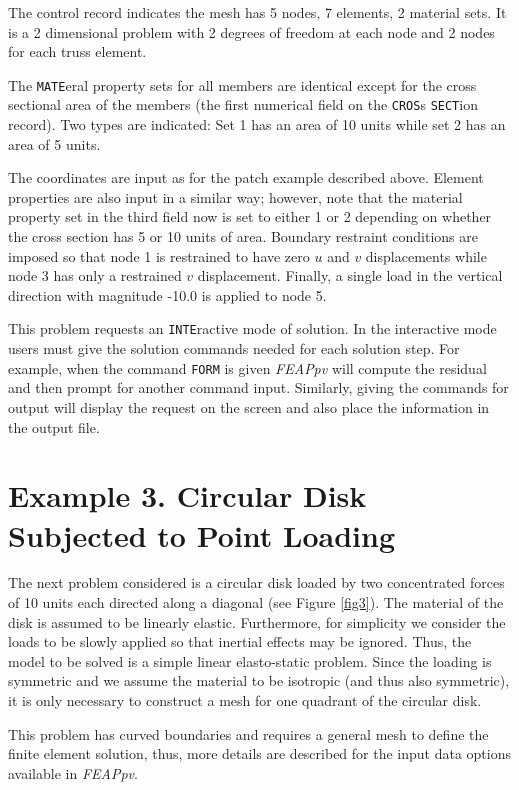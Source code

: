 The control record indicates the mesh has 5 nodes, 7 elements, 2 
material sets. It is a 2 dimensional problem with 2 degrees of freedom at each
node and 2 nodes for each truss element.

The {\tt MATE}eral property sets for all members
are identical except for the cross sectional
area of the members (the first numerical field on the {\tt CROS}s
{\tt SECT}ion record). Two types are indicated: Set 1 has an area of 10 units
while set 2 has an area of 5 units.

The coordinates are input as for the patch example described above.  Element
properties are also input in a similar way; however, note that the material
property set in the third field now is set to either 1 or 2 depending on
whether the cross section has 5 or 10 units of area.
Boundary restraint conditions are imposed so that node 1 is restrained
to have zero $u$ and $v$ displacements while node 3 has only a restrained
$v$ displacement.  Finally, a single load in the vertical direction
with magnitude -10.0 is applied to node 5.

This problem requests an {\tt INTE}ractive mode of solution.  In the interactive
mode users must give the solution commands needed for each solution step.
For example, when the command {\tt FORM} is given {\sl FEAPpv} will compute
the residual and then prompt for another command input.  Similarly, 
giving the commands for output will display the request on the screen and
also place the information in the output file.

\section{Example 3. Circular Disk Subjected to Point Loading}
\label{ex3}

The next problem considered is a circular disk loaded by
two concentrated forces of 10 units each
directed along a diagonal (see Figure \ref{fig3}). The material
of the disk is assumed to be linearly elastic.  Furthermore, for simplicity
we consider the loads to be slowly applied so that inertial effects may
be ignored.  Thus, the model to be solved is a simple linear elasto-static
problem.  Since the loading is symmetric and we assume the material to be
isotropic (and thus also symmetric), it is only necessary to construct a mesh
for one quadrant of the circular disk.

This problem has curved boundaries and requires a general mesh
to define the finite element solution, thus, more details
are described for the input data options available in {\sl FEAPpv}.

